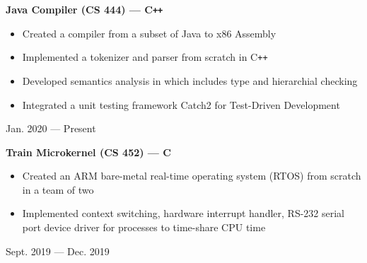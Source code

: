 \documentclass[9pt]{extarticle}
\begin{document}
\begin{minipage}[t]{0.80\linewidth}
\begin{flushleft}
\textbf{Java Compiler (CS 444) --- C\texttt{++}}
\begin{itemize}
	\item Created a compiler from a subset of Java to x86 Assembly
	\item Implemented a tokenizer and parser from scratch in
		C\texttt{++}
	\item Developed semantics analysis in which includes
		type and hierarchial checking
	\item Integrated a unit testing framework Catch2
		for Test-Driven Development
\end{itemize}
\end{flushleft}
\end{minipage}
\hfill
\begin{minipage}[t]{0.19\linewidth}
\begin{flushright}
Jan. 2020 --- Present
\end{flushright}
\end{minipage}

\vfill

\begin{minipage}[t]{0.80\linewidth}
\begin{flushleft}
\textbf{Train Microkernel (CS 452) --- C}
\begin{itemize}
	\item Created an ARM bare-metal real-time operating system (RTOS)
		from scratch in a team of two
	\item Implemented context switching, hardware interrupt handler,
		RS-232 serial port device driver for processes to time-share CPU time
\end{itemize}
\end{flushleft}
\end{minipage}
\hfill
\begin{minipage}[t]{0.19\linewidth}
\begin{flushright}
Sept. 2019 --- Dec. 2019
\end{flushright}
\end{minipage}

\vfill
\end{document}
